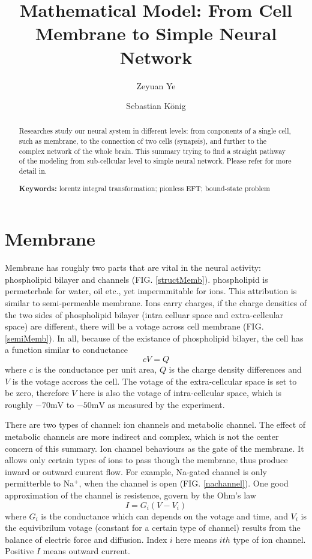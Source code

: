 \documentclass[11pt]{article}
\date{}
\title{Mathematical Model: From Cell Membrane to Simple Neural Network}
\author[1]{Zeyuan Ye}
\author[2]{Sebastian K{\"o}nig}
\begin{document}
  \maketitle

\begin{abstract}

  Researches study our neural system in different levels: from
  conponents of a single cell, such as membrane, to the connection of two cells
  (synapsis), and further to the complex network
  of the whole brain. This summary trying to find a straight pathway of the
  modeling from sub-cellcular level to simple neural network. Please refer
  \cite{mitcourse} for more detail
  in.

\noindent \textbf{Keywords:} lorentz integral transformation; pionless EFT;
  bound-state problem\\ %
\end{abstract}

\section{Membrane}
Membrane has roughly two parts that are vital in the neural
activity: phospholipid bilayer and channels (FIG. \ref{structMemb}). phospholipid is permeterbale for water, oil
etc., yet impermmitable for ions. This attribution is similar to semi-permeable
membrane. Ions carry charges, if the charge
densities of the two sides of phospholipid bilayer (intra celluar space and
extra-cellcular space) are different, there will be a votage across cell
membrane (FIG. \ref{semiMemb}). In all, because of the existance of phospholipid bilayer, the cell has a
function similar to conductance
\begin{equation}
  c V = Q
  \label{capt}
\end{equation}
where $c$ is the conductance per unit area, $Q$ is the charge density
differences and $V$ is the votage accross the cell. The votage of the
extra-cellcular space is set to be zero, therefore $V$ here is also the votage
of intra-cellcular space, which is roughly $-70 \text{mV}$ to $ -50 \text{mV}$ as measured
by the experiment.

There are two types of channel: ion channels and metabolic channel. The effect
of metabolic channels are more indirect and complex, which is not the center
concern of this summary. Ion channel behaviours as the gate of the membrane. It
allows only certain types of ions to pass though the membrane, thus produce inward
or outward cuurent flow. For example,
Na-gated channel is only permitterble to Na$^+$, when the channel is open (FIG. \ref{nachannel}). One
good approximation of the channel is resistence, govern by the Ohm's law
\begin{equation}
  I = G_i (V - V_i)
  \label{olm}
\end{equation}
where $G_i$ is the conductance which can depends on the votage and time, and
$V_i$ is the equivibrilum votage (constant for a certain type of channel) results from
the balance of electric force and diffusion. Index $i$ here means
$ith$ type of ion channel. Positive $I$ means outward current.
\end{document}
